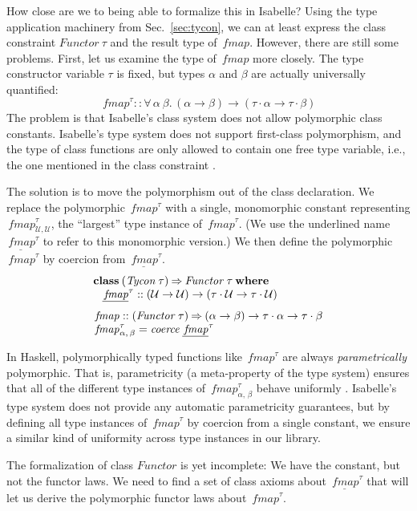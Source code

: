 \documentclass{sigplanconf}
\newcommand{\To}{\mathbin{\Rightarrow}}
\newcommand{\U}{\ensuremath{\mathcal{U}}}
\newcommand{\univ}[1]{\ensuremath{\underline{#1}}}
\newcommand{\kwd}[1]{\mathbf{#1}}
\newcommand{\hsc}[1]{\ensuremath{\mathit{#1}}}
\newcommand{\hscoerce}{\hsc{coerce}}
\newcommand{\fmap}{\,\hsc{fmap}} %
\newcommand{\fmapU}{\univ{\fmap}}
\newcommand{\tA}{\alpha}
\newcommand{\tB}{\beta}
\newcommand{\tT}{\tau}
\theoremstyle{definition}
\begin{document}
How close are we to being able to formalize this in Isabelle? Using the type application machinery from Sec.~\ref{sec:tycon}, we can at least express the class constraint $\hsc{Functor}\:\tT$ and the result type of $\fmap$. However, there are still some problems. First, let us examine the type of $\fmap$ more closely. The type constructor variable $\tT$ is fixed, but types $\tA$ and $\tB$ are actually universally quantified:
%
\begin{equation*}
\fmap^\tT :: \forall\,\tA\:\tB.\,(\tA \to \tB) \to (\tT\cdot\tA \to \tT\cdot\tB)
\end{equation*}
%
The problem is that Isabelle's class system does not allow polymorphic class constants. Isabelle's type system does not support first-class polymorphism, and the type of class functions are only allowed to contain one free type variable, i.e., the one mentioned in the class constraint \cite{Wenzel1997}.

The solution is to move the polymorphism out of the class declaration. We replace the polymorphic $\fmap^\tT$ with a single, monomorphic constant representing $\fmap^\tT_{\U,\U}$, the ``largest'' type instance of $\fmap^\tT$. (We use the underlined name $\fmapU^\tT$ to refer to this monomorphic version.) We then define the polymorphic $\fmap^\tT$ by coercion from $\fmapU^\tT$.
%
\begin{align*}
  & \kwd{class}\:(\hsc{Tycon}\:\tT) \To \hsc{Functor}\:\tT\:\kwd{where}
  \\[-\jot]
  & \hspace{8pt} \fmapU^\tT :: (\U \to \U) \to (\tT\cdot\U \to \tT\cdot\U)
  \\[\jot]
  & \fmap :: (\hsc{Functor}\:\tT) \To (\tA \to \tB) \to \tT\cdot\tA \to \tT\cdot\tB
  \\[-\jot]
  & \fmap^\tT_{\tA,\,\tB} = \hscoerce\:\fmapU^\tT
\end{align*}

In Haskell, polymorphically typed functions like $\fmap^\tT$ are always \emph{parametrically} polymorphic. That is, parametricity (a meta-property of the type system) ensures that all of the different type instances of $\fmap^\tT_{\tA,\,\tB}$ behave uniformly \cite{Wadler1989}. Isabelle's type system does not provide any automatic parametricity guarantees, but by defining all type instances of $\fmap^\tT$ by coercion from a single constant, we ensure a similar kind of uniformity across type instances in our library.

The formalization of class \hsc{Functor} is yet incomplete: We have the constant, but not the functor laws. We need to find a set of class axioms about $\fmapU^\tT$ that will let us derive the polymorphic functor laws about $\fmap^\tT$.
\end{document}
